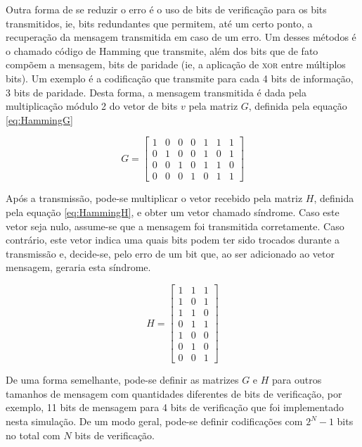 \documentclass[journal,comsoc]{IEEEtran}
\begin{document}
		Outra forma de se reduzir o erro é o uso de bits de verificação para os bits transmitidos, ie, bits redundantes que permitem, até um certo ponto, a recuperação da mensagem transmitida em caso de um erro. Um desses métodos é o chamado código de Hamming que transmite, além dos bits que de fato compõem a mensagem, bits de paridade (ie, a aplicação de \textsc{xor} entre múltiplos bits). Um exemplo é a codificação que transmite para cada 4 bits de informação, 3 bits de paridade. Desta forma, a mensagem transmitida é dada pela multiplicação módulo 2 do vetor de bits $v$ pela matriz $G$, definida pela equação \ref{eq:HammingG}
		
		\begin{equation}
			G = \begin{bmatrix}
					1 & 0 & 0 & 0 & 1 & 1 & 1 \\
					0 & 1 & 0 & 0 & 1 & 0 & 1 \\
					0 & 0 & 1 & 0 & 1 & 1 & 0 \\
					0 & 0 & 0 & 1 & 0 & 1 & 1
				\end{bmatrix}
			\label{eq:HammingG}
		\end{equation} 
		
		Após a transmissão, pode-se multiplicar o vetor recebido pela matriz $H$, definida pela equação \ref{eq:HammingH}, e obter um vetor chamado síndrome. Caso este vetor seja nulo, assume-se que a mensagem foi transmitida corretamente. Caso contrário, este vetor indica uma quais bits podem ter sido trocados durante a transmissão e, decide-se, pelo erro de um bit que, ao ser adicionado ao vetor mensagem, geraria esta síndrome.
		
		\begin{equation}
			H = \begin{bmatrix}
					1 & 1 & 1 \\
					1 & 0 & 1 \\
					1 & 1 & 0 \\
					0 & 1 & 1 \\
					1 & 0 & 0 \\
					0 & 1 & 0 \\
					0 & 0 & 1 
				\end{bmatrix}
			\label{eq:HammingH}
		\end{equation} 
		
		De uma forma semelhante, pode-se definir as matrizes $G$ e $H$ para outros tamanhos de mensagem com quantidades diferentes de bits de verificação, por exemplo, 11 bits de mensagem para 4 bits de verificação que foi implementado nesta simulação. De um modo geral, pode-se definir codificações com $2^N-1$ bits no total com $N$ bits de verificação.
	
\end{document}

